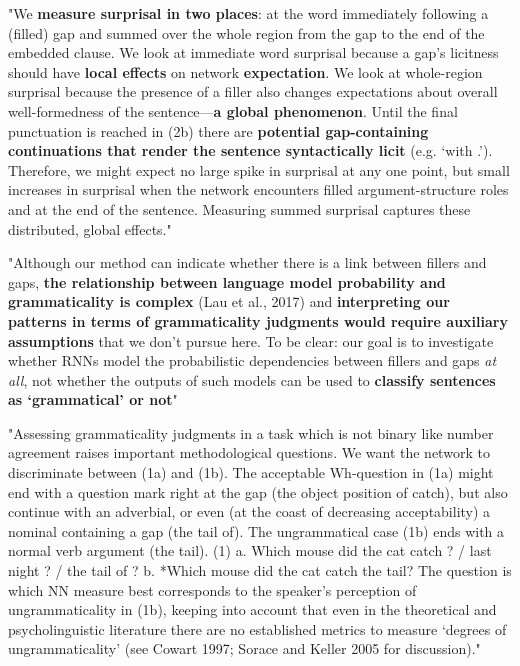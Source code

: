 "We \textbf{measure surprisal in two places}: at the word immediately following a (filled) gap and summed over the whole region from the gap to the end of the embedded clause. We look at immediate word surprisal because a gap’s licitness should have \textbf{local effects} on network \textbf{expectation}. We look at whole-region surprisal because the presence of a filler also changes expectations about overall well-formedness of the sentence—\textbf{a global phenomenon}. Until the final punctuation is reached in (2b) there are \textbf{potential gap-containing continuations that render the sentence syntactically licit} (e.g. ‘with .’). Therefore, we might expect no large spike in surprisal at any one point, but small increases in surprisal when the network encounters filled argument-structure roles and at the end of the sentence. Measuring summed surprisal captures these distributed, global effects."  \citep{wilcox2018rnn}


"Although our method can indicate whether there is a link between fillers and gaps, \textbf{the relationship between language model probability and grammaticality is complex} (Lau et al., 2017) and\textbf{ interpreting our patterns in terms of grammaticality judgments would require auxiliary assumptions} that we don’t pursue here. To be clear: our goal is to investigate whether RNNs model the probabilistic dependencies between fillers and gaps \textit{at all}, not whether the outputs of such models can be used to \textbf{classify sentences as ‘grammatical’ or not}" \citep{wilcox2018rnn}

"Assessing grammaticality judgments in a task which is not binary like number agreement raises important methodological questions. We want the network to discriminate between (1a) and (1b). The acceptable Wh-question in (1a) might end with a question mark right at the gap (the object position of catch), but also continue with an adverbial, or even (at the coast of decreasing acceptability) a nominal containing a gap (the tail of). The ungrammatical case (1b) ends with a normal verb argument (the tail). 
(1) a. Which mouse did the cat catch {? / last night ? / the tail of ? }
b. *Which mouse did the cat catch the tail? The question is which NN measure best corresponds to the speaker’s perception of ungrammaticality in (1b), keeping into account that even in the theoretical and psycholinguistic literature there are no established metrics to measure ‘degrees of ungrammaticality’ (see Cowart 1997; Sorace and Keller 2005 for discussion)." \citep{chowdhury2018rnn}

